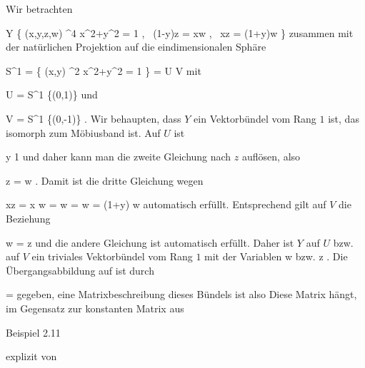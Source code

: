 {





Wir betrachten

\mavergleichskettedisp
{\vergleichskette
{Y
}
{ } { \left\{ (x,y,z,w) \in \R^4  \mid   x^2+y^2 = 1 , \, (1-y)z = xw   , \,  xz = (1+y)w    \right\}
}
{ } {
}
{ } {
}
{ } {
}
}
{}{}{}
zusammen mit der natürlichen Projektion auf die eindimensionalen Sphäre

\mavergleichskettedisp
{\vergleichskette
{S^1
}
{ =} { \left\{ (x,y) \in \R^2  \mid   x^2+y^2 = 1        \right\}
}
{ =} { U \cup V
}
{ } {
}
{ } {
}
}
{}{}{}
mit

\mavergleichskette
{\vergleichskette
{U
}
{ = }{S^1 \setminus \{(0,1)\}
}
{  }{
}
{    }{
}
{   }{
}
}
{}{}{}
und

\mavergleichskette
{\vergleichskette
{V
}
{ = }{S^1 \setminus \{(0,-1)\}
}
{  }{
}
{    }{
}
{   }{
}
}
{}{}{.}
Wir behaupten, dass $Y$ ein Vektorbündel vom Rang $1$ ist, das isomorph zum Möbiusband ist. Auf $U$ ist

\mavergleichskette
{\vergleichskette
{ y
}
{ \neq }{ 1
}
{  }{
}
{    }{
}
{   }{
}
}
{}{}{}
und daher kann man die zweite Gleichung nach $z$ auflösen, also

\mavergleichskettedisp
{\vergleichskette
{z
}
{ =} { {  }  w
}
{ } {
}
{ } {
}
{ } {
}
}
{}{}{.}
Damit ist die dritte Gleichung wegen

\mavergleichskettedisp
{\vergleichskette
{ xz
}
{ =} { {  } x w
}
{ =} { {  }  w
}
{ =} { {  }  w
}
{ =} { (1+y) w
}
}
{}{}{}
automatisch erfüllt. Entsprechend gilt auf $V$ die Beziehung

\mavergleichskettedisp
{\vergleichskette
{ w
}
{ =} { {  } z
}
{ } {
}
{ } {
}
{ } {
}
}
{}{}{}
und die andere Gleichung ist automatisch erfüllt. Daher ist $Y$ auf $U$ bzw. auf $V$ ein triviales Vektorbündel vom Rang $1$ mit der Variablen
\mathkor {} {w} {bzw.} {z} {.}
Die Übergangsabbildung auf
 ist durch

\mavergleichskettedisp
{\vergleichskette
{ {  }
}
{ =} { {  }
}
{ } {
}
{ } {
}
{ } {
}
}
{}{}{}
gegeben, eine Matrixbeschreibung dieses Bündels ist also
 Diese Matrix hängt, im Gegensatz zur konstanten Matrix aus

Beispiel 2.11

explizit von

}
